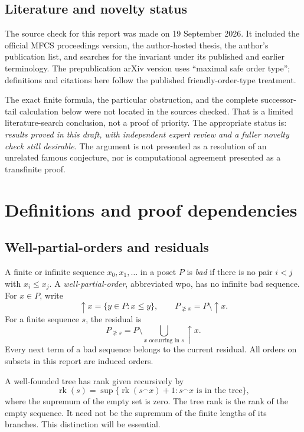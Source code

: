 \documentclass[11pt,letterpaper]{article}
\theoremstyle{definition}
\theoremstyle{remark}
\newcommand{\res}[2]{#1_{\not\ge #2}}
\begin{document}
\subsection{Literature and novelty status}
The source check for this report was made on 19 September 2026. It included
the official MFCS proceedings version, the author-hosted thesis, the
author's publication list, and searches for the invariant under its
published and earlier terminology. The prepublication arXiv version uses
``maximal safe order type''; definitions and citations here follow the
published friendly-order-type treatment.

The exact finite formula, the particular obstruction, and the complete
successor-tail calculation below were not located in the sources checked.
That is a limited literature-search conclusion, not a proof of priority.
The appropriate status is: \emph{results proved in this draft, with
independent expert review and a fuller novelty check still desirable}.
The argument is not presented as a resolution of an unrelated famous
conjecture, nor is computational agreement presented as a transfinite
proof.

\section{Definitions and proof dependencies}\label{sec:preliminaries}

\subsection{Well-partial-orders and residuals}
A finite or infinite sequence $x_0,x_1,\ldots$ in a poset $P$ is
\emph{bad} if there is no pair $i<j$ with $x_i\le x_j$. A
\emph{well-partial-order}, abbreviated wpo, has no infinite bad sequence.
For $x\in P$, write
\[
 \uparrow x=\{y\in P:x\le y\},\qquad
 \res P x=P\setminus\uparrow x.
\]
For a finite sequence $s$, the residual is
\[
 \res P s=P\setminus\bigcup_{x\text{ occurring in }s}\uparrow x.
\]
Every next term of a bad sequence belongs to the current residual.
All orders on subsets in this report are induced orders.

A well-founded tree has rank given recursively by
\[
 \operatorname{rk}(s)
 =\sup\{\operatorname{rk}(s^{\frown}x)+1:s^{\frown}x\text{ is in the tree}\},
\]
where the supremum of the empty set is zero. The tree rank is the rank of
the empty sequence. It need not be the supremum of the finite lengths of
its branches. This distinction will be essential.
\end{document}
